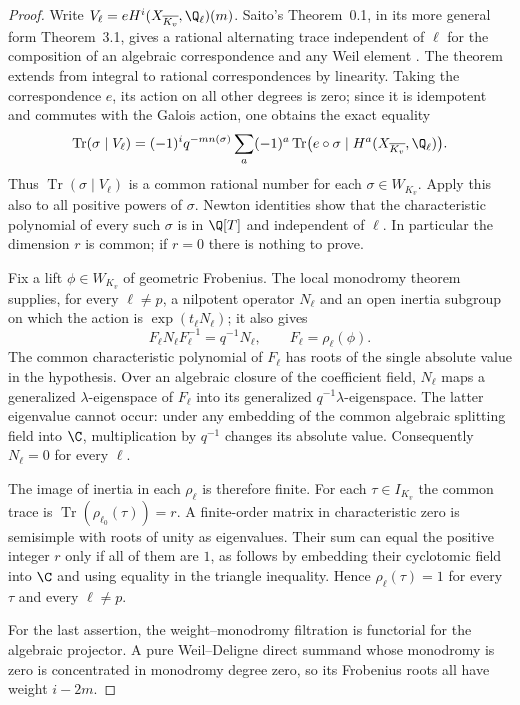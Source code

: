 \begin{proof}
Write $V_\ell=eH^i(X_{\overline{K_v}},\Q_\ell)(m)$.
Saito's Theorem~0.1, in its more general form Theorem~3.1,
gives a rational alternating trace independent of $\ell$ for the
composition of an algebraic correspondence and any Weil element
\citep[Theorems~0.1 and 3.1]{c_saito2003weights}.
The theorem extends from integral to rational correspondences by
linearity.  Taking the correspondence $e$, its action on all other
degrees is zero; since it is idempotent and commutes with the Galois
action, one obtains the exact equality
\[
 \operatorname{Tr}(\sigma\mid V_\ell)
 =(-1)^i q^{-m n(\sigma)}
   \sum_a(-1)^a\operatorname{Tr}
   \bigl(e\circ\sigma\mid H^a(X_{\overline{K_v}},\Q_\ell)\bigr).
\]
Thus $\operatorname{Tr}(\sigma\mid V_\ell)$ is a common rational
number for each $\sigma\in W_{K_v}$.  Apply this also to all positive
powers of $\sigma$.  Newton identities show that the characteristic
polynomial of every such $\sigma$ is in $\Q[T]$ and independent of
$\ell$.  In particular the dimension $r$ is common; if $r=0$ there
is nothing to prove.

Fix a lift $\phi\in W_{K_v}$ of geometric Frobenius.  The local
monodromy theorem supplies, for every $\ell\ne p$, a nilpotent operator
$N_\ell$ and an open inertia subgroup on which the action is
$\exp(t_\ell N_\ell)$; it also gives
\[
 F_\ell N_\ell F_\ell^{-1}=q^{-1}N_\ell,
 \qquad F_\ell=\rho_\ell(\phi).
\]
The common characteristic polynomial of $F_\ell$ has roots of the
single absolute value in the hypothesis.  Over an algebraic closure
of the coefficient field, $N_\ell$ maps a generalized
$\lambda$-eigenspace of $F_\ell$ into its generalized
$q^{-1}\lambda$-eigenspace.  The latter eigenvalue cannot occur:
under any embedding of the common algebraic splitting field into
$\C$, multiplication by $q^{-1}$ changes its absolute value.
Consequently $N_\ell=0$ for every $\ell$.

The image of inertia in each $\rho_\ell$ is therefore finite.  For
each $\tau\in I_{K_v}$ the common trace is
$\operatorname{Tr}(\rho_{\ell_0}(\tau))=r$.  A finite-order matrix
in characteristic zero is semisimple with roots of unity as
eigenvalues.  Their sum can equal the positive integer $r$ only if
all of them are $1$, as follows by embedding their cyclotomic field
into $\C$ and using equality in the triangle inequality.  Hence
$\rho_\ell(\tau)=1$ for every $\tau$ and every $\ell\ne p$.

For the last assertion, the weight--monodromy filtration is functorial
for the algebraic projector.  A pure Weil--Deligne direct summand
whose monodromy is zero is concentrated in monodromy degree zero,
so its Frobenius roots all have weight $i-2m$.
\end{proof}

